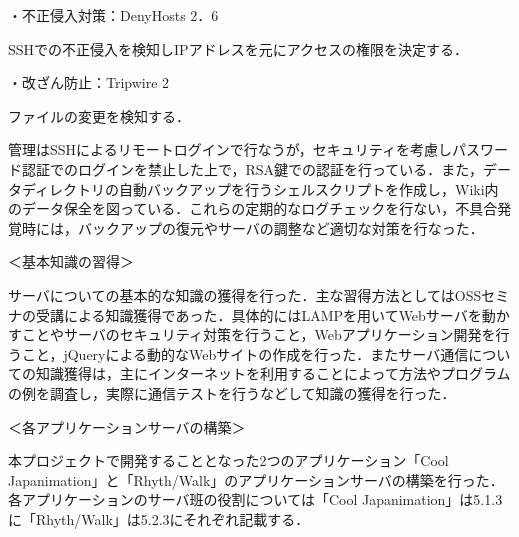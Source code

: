 \par
\par ・不正侵入対策：DenyHosts 2．6
\par SSHでの不正侵入を検知しIPアドレスを元にアクセスの権限を決定する．
\par
\par ・改ざん防止：Tripwire 2
\par ファイルの変更を検知する．
\par 
\par
管理はSSHによるリモートログインで行なうが，セキュリティを考慮しパスワード認証でのログインを禁止した上で，RSA鍵での認証を行っている．また，データディレクトリの自動バックアップを行うシェルスクリプトを作成し，Wiki内のデータ保全を図っている．これらの定期的なログチェックを行ない，不具合発覚時には，バックアップの復元やサーバの調整など適切な対策を行なった．
\par 
\par ＜基本知識の習得＞
\par
サーバについての基本的な知識の獲得を行った．主な習得方法としてはOSSセミナの受講による知識獲得であった．具体的にはLAMPを用いてWebサーバを動かすことやサーバのセキュリティ対策を行うこと，Webアプリケーション開発を行うこと，jQueryによる動的なWebサイトの作成を行った．またサーバ通信についての知識獲得は，主にインターネットを利用することによって方法やプログラムの例を調査し，実際に通信テストを行うなどして知識の獲得を行った．
\par ＜各アプリケーションサーバの構築＞
\par
本プロジェクトで開発することとなった2つのアプリケーション「Cool Japanimation」と「Rhyth/Walk」のアプリケーションサーバの構築を行った．各アプリケーションのサーバ班の役割については「Cool Japanimation」は5.1.3に「Rhyth/Walk」は5.2.3にそれぞれ記載する．
